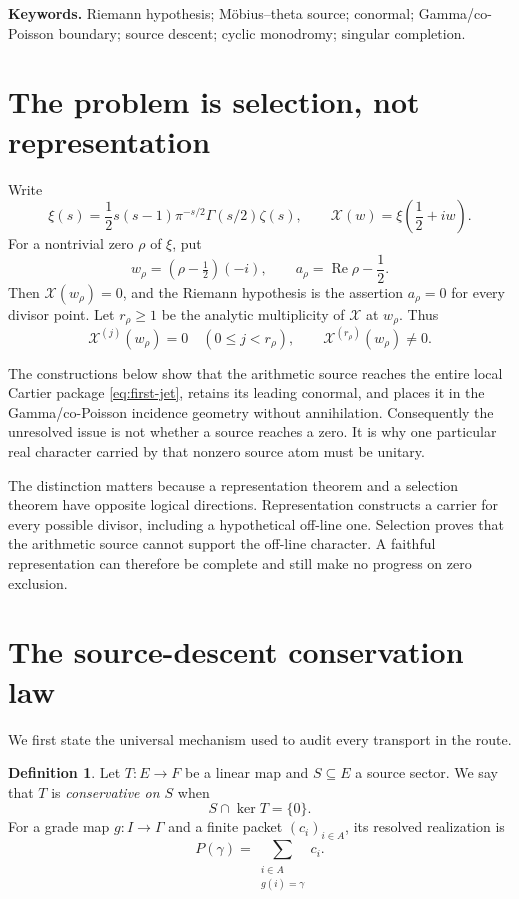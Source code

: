 \documentclass[11pt]{article}
\theoremstyle{definition}
\newtheorem{definition}[theorem]{Definition}
\theoremstyle{remark}
\newcommand{\XiC}{\mathcal X}
\newcommand{\Rea}{\operatorname{Re}}
\begin{document}
\medskip
\noindent\textbf{Keywords.}
Riemann hypothesis; M\"obius--theta source; conormal; Gamma/co-Poisson
boundary; source descent; cyclic monodromy; singular completion.

\section{The problem is selection, not representation}

Write
\[
 \xi(s)=\frac12s(s-1)\pi^{-s/2}\Gamma(s/2)\zeta(s),
 \qquad
 \XiC(w)=\xi\!\left(\frac12+iw\right).
\]
For a nontrivial zero \(\rho\) of \(\xi\), put
\[
 w_\rho=(\rho-\tfrac12)(-i),
 \qquad
 a_\rho=\Rea\rho-\frac12.
\]
Then \(\XiC(w_\rho)=0\), and the Riemann hypothesis is the assertion
\(a_\rho=0\) for every divisor point.  Let \(r_\rho\geq1\) be the analytic
multiplicity of \(\XiC\) at \(w_\rho\).  Thus
\[
 \XiC^{(j)}(w_\rho)=0\quad(0\leq j<r_\rho),
 \qquad
 \XiC^{(r_\rho)}(w_\rho)\neq0.
\tag{1.1}\label{eq:first-jet}
\]

The constructions below show that the arithmetic source reaches the entire
local Cartier package \eqref{eq:first-jet}, retains its leading conormal, and
places it in the Gamma/co-Poisson incidence geometry without annihilation.
Consequently the unresolved issue is not whether a source reaches a zero.
It is why one particular real character carried by that nonzero source atom
must be unitary.

The distinction matters because a representation theorem and a selection
theorem have opposite logical directions.  Representation constructs a
carrier for every possible divisor, including a hypothetical off-line one.
Selection proves that the arithmetic source cannot support the off-line
character.  A faithful representation can therefore be complete and still
make no progress on zero exclusion.

\section{The source-descent conservation law}

We first state the universal mechanism used to audit every transport in the
route.

\begin{definition}
Let \(T:E\to F\) be a linear map and \(S\subseteq E\) a source sector.  We
say that \(T\) is \emph{conservative on \(S\)} when
\[
                 S\cap\ker T=\{0\}.
\]
For a grade map \(g:I\to\Gamma\) and a finite packet
\((c_i)_{i\in A}\), its resolved realization is
\[
 P(\gamma)=\sum_{\substack{i\in A\\g(i)=\gamma}}c_i.
\]
\end{definition}
\end{document}
